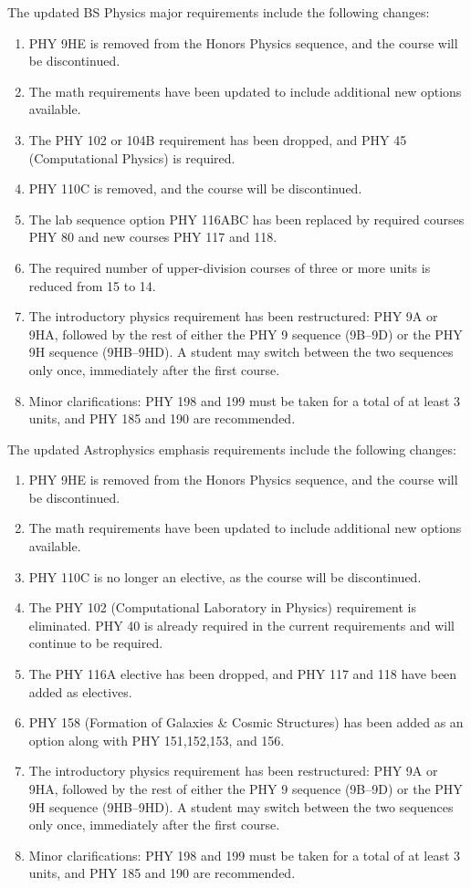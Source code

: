\documentclass[12pt]{article}
\begin{document}
\noindent
The updated BS Physics major requirements include the following changes:
\begin{enumerate}
\item PHY 9HE is removed from the Honors Physics sequence, and the
  course will be discontinued.
\item The math requirements have been updated to include additional
  new options available.
\item The PHY 102 or 104B requirement has been dropped, and PHY 45
  (Computational Physics) is required.
\item PHY 110C is removed, and the course will be discontinued.
\item The lab sequence option PHY 116ABC has been replaced by required courses PHY 80
  and new courses PHY 117 and 118.
\item The required number of upper-division courses of three or more
  units is reduced from 15 to 14.
\item The introductory physics requirement has been restructured:  PHY
  9A or 9HA, followed by the rest of either the PHY 9 sequence
  (9B--9D) or the PHY 9H sequence (9HB--9HD).  A student may switch
  between the two sequences only once, immediately after the first
  course.
\item Minor clarifications:  PHY 198 and 199 must be taken for a total
  of at least 3 units, and PHY 185 and 190 are recommended.
\end{enumerate}
The updated Astrophysics emphasis requirements include the following changes:
\begin{enumerate}
\item PHY 9HE is removed from the Honors Physics sequence, and the
  course will be discontinued.
\item The math requirements have been updated to include additional
  new options available.
\item PHY 110C is no longer an elective, as the course will be discontinued.
\item The PHY 102 (Computational Laboratory in Physics) requirement is
  eliminated.  PHY 40 is already required in the current requirements
  and will continue to be required.
\item The PHY 116A elective has been dropped, and PHY 117 and 118 have been added as electives.
\item PHY 158 (Formation of Galaxies \& Cosmic Structures) has been added as an option along
  with PHY 151,152,153, and 156.
\item The introductory physics requirement has been restructured:  PHY
  9A or 9HA, followed by the rest of either the PHY 9 sequence
  (9B--9D) or the PHY 9H sequence (9HB--9HD).  A student may switch
  between the two sequences only once, immediately after the first
  course.
\item Minor clarifications:  PHY 198 and 199 must be taken for a total
  of at least 3 units, and PHY 185 and 190 are recommended.
\end{enumerate}
\end{document}
